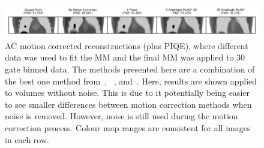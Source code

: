            \begin{figure}
                \centering
                
                \includegraphics[width=1.0\linewidth]{figures/motion_correction_2_results_2_noiseless_best_visual_analysis.png}
                
                \captionsetup{singlelinecheck=false}
                \caption{
                    \gls{AC} motion corrected reconstructions (plus \gls{PIQE}), where different data was used to fit the \gls{MM} and the final \gls{MM} was applied to $30$ gate binned data. The methods presented here are a combination of the best one method from~, ~, and~. Here, results are shown applied to volumes without noise. This is due to it potentially being easier to see smaller differences between motion correction methods when noise is removed. However, noise is still used during the motion correction process. Colour map ranges are consistent for all images in each row.
                }
                
                \label{fig:evaluation_of_pet_ct_motion_correction_incorporating_motion_models_using_mlacf_and_complex_gating_schemes_results_noiseless_best_visual_analysis}
            \end{figure}
            
